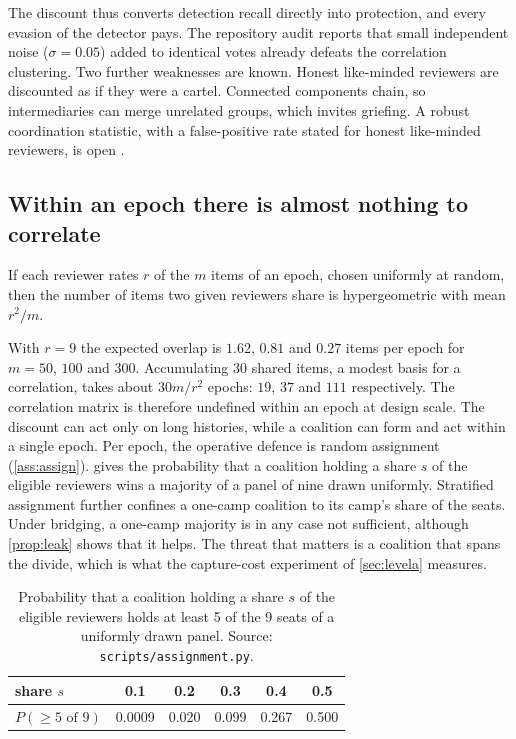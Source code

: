 The discount thus converts detection recall directly into protection, and every evasion of the
detector pays. The repository audit reports that small independent noise ($\sigma=0.05$) added
to identical votes already defeats the correlation clustering. Two further weaknesses are known.
Honest like-minded reviewers are discounted as if they were a cartel. Connected components chain,
so intermediaries can merge unrelated groups, which invites griefing. A robust coordination
statistic, with a false-positive rate stated for honest like-minded reviewers, is open \openq.

\subsection{Within an epoch there is almost nothing to correlate}

\begin{proposition}\label{prop:overlap}\proved{}
If each reviewer rates $r$ of the $m$ items of an epoch, chosen uniformly at random, then the
number of items two given reviewers share is hypergeometric with mean $r^2/m$.
\end{proposition}

With $r=9$ the expected overlap is $1.62$, $0.81$ and $0.27$ items per epoch for $m=50$, $100$
and $300$. Accumulating $30$ shared items, a modest basis for a correlation, takes about
$30m/r^2$ epochs: $19$, $37$ and $111$ respectively. The correlation matrix is therefore
undefined within an epoch at design scale. The discount can act only on long histories, while a
coalition can form and act within a single epoch. Per epoch, the operative defence is random
assignment (\cref{ass:assign}).  gives the probability that a coalition
holding a share $s$ of the eligible reviewers wins a majority of a panel of nine drawn uniformly.
Stratified assignment further confines a one-camp coalition to its camp's share of the seats.
Under bridging, a one-camp majority is in any case not sufficient, although \cref{prop:leak}
shows that it helps. The threat that matters is a coalition that spans the divide, which is what
the capture-cost experiment of \cref{sec:levela} measures.

\begin{table}[t]
\centering\small
\caption{Probability that a coalition holding a share $s$ of the eligible reviewers holds at
least 5 of the 9 seats of a uniformly drawn panel. Source: \texttt{scripts/assignment.py}.}
\label{tab:assignment}
\begin{tabular}{@{}lccccc@{}}
\toprule
share $s$ & 0.1 & 0.2 & 0.3 & 0.4 & 0.5\\
\midrule
$P(\ge5\text{ of }9)$ & 0.0009 & 0.020 & 0.099 & 0.267 & 0.500\\
\bottomrule
\end{tabular}
\end{table}
